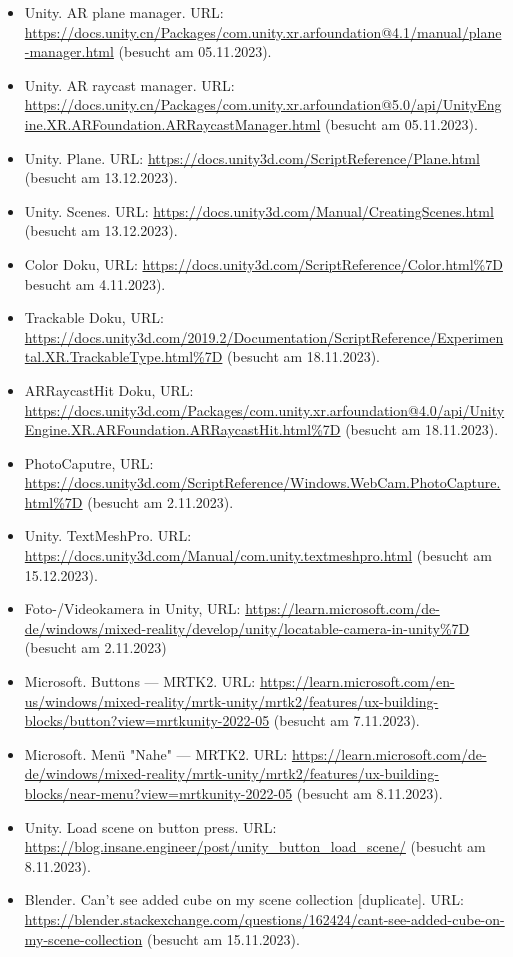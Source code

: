 \begin{itemize}
    \item Unity. AR plane manager. URL: \url{https://docs.unity.cn/Packages/com.unity.xr.arfoundation@4.1/manual/plane-manager.html} (besucht am 05.11.2023).
    \item Unity. AR raycast manager. URL: \url{https://docs.unity.cn/Packages/com.unity.xr.arfoundation@5.0/api/UnityEngine.XR.ARFoundation.ARRaycastManager.html} (besucht am 05.11.2023).
    \item Unity. Plane. URL: \url{https://docs.unity3d.com/ScriptReference/Plane.html} (besucht am 13.12.2023).
    \item Unity. Scenes. URL: \url{https://docs.unity3d.com/Manual/CreatingScenes.html} (besucht am 13.12.2023).
    \item Color Doku, URL:  \url{https://docs.unity3d.com/ScriptReference/Color.html%7D} besucht am 4.11.2023).
    \item Trackable Doku, URL:  \url{https://docs.unity3d.com/2019.2/Documentation/ScriptReference/Experimental.XR.TrackableType.html%7D} (besucht am 18.11.2023).
    \item ARRaycastHit Doku, URL:  \url{https://docs.unity3d.com/Packages/com.unity.xr.arfoundation@4.0/api/UnityEngine.XR.ARFoundation.ARRaycastHit.html%7D} (besucht am 18.11.2023).
    \item PhotoCaputre, URL:  \url{https://docs.unity3d.com/ScriptReference/Windows.WebCam.PhotoCapture.html%7D} (besucht am 2.11.2023).
    \item Unity. TextMeshPro. URL: \url{https://docs.unity3d.com/Manual/com.unity.textmeshpro.html} (besucht am 15.12.2023).
    \item Foto-/Videokamera in Unity, URL:  \url{https://learn.microsoft.com/de-de/windows/mixed-reality/develop/unity/locatable-camera-in-unity%7D} (besucht am 2.11.2023)
    \item Microsoft. Buttons — MRTK2. URL: \url{https://learn.microsoft.com/en-us/windows/mixed-reality/mrtk-unity/mrtk2/features/ux-building-blocks/button?view=mrtkunity-2022-05} (besucht am 7.11.2023).
    \item Microsoft. Menü "Nahe" — MRTK2. URL: \url{https://learn.microsoft.com/de-de/windows/mixed-reality/mrtk-unity/mrtk2/features/ux-building-blocks/near-menu?view=mrtkunity-2022-05} (besucht am 8.11.2023).
    \item Unity. Load scene on button press. URL: \url{https://blog.insane.engineer/post/unity_button_load_scene/} (besucht am 8.11.2023).
    \item Blender. Can't see added cube on my scene collection [duplicate]. URL: \url{https://blender.stackexchange.com/questions/162424/cant-see-added-cube-on-my-scene-collection} (besucht am 15.11.2023).

\end{itemize}
